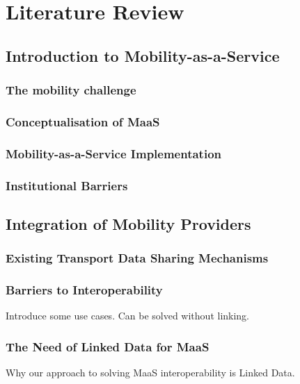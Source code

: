 \chapter{Literature Review}
\label{chap:literature review}


\section{Introduction to Mobility-as-a-Service}
\subsection{The mobility challenge}

\subsection{Conceptualisation of MaaS}
\subsection{Mobility-as-a-Service Implementation}
\subsection{Institutional Barriers}


\section{Integration of Mobility Providers}
\subsection{Existing Transport Data Sharing Mechanisms}
\subsection{Barriers to Interoperability}
Introduce some use cases. Can be solved without linking.
\subsection{The Need of Linked Data for MaaS}
Why our approach to solving MaaS interoperability is Linked Data.

